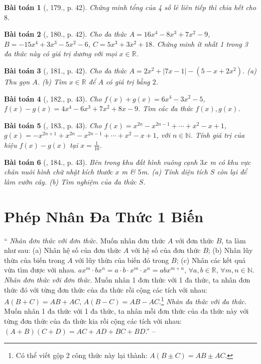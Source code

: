 \documentclass{article}
\newtheorem{baitoan}{Bài toán}
\begin{document}
\begin{baitoan}[\cite{Tuyen_Toan_7}, 179., p. 42]
	Chứng minh tổng của 4 số lẻ liên tiếp thì chia hết cho $8$.
\end{baitoan}

\begin{baitoan}[\cite{Tuyen_Toan_7}, 180., p. 42]
	Cho đa thức $A = 16x^4 - 8x^3 + 7x^2 - 9$, $B = -15x^4 + 3x^3 - 5x^2 - 6$, $C = 5x^3 + 3x^2 + 18$. Chứng minh ít nhất 1 trong 3 đa thức này có giá trị dương với mọi $x\in\mathbb{R}$.
\end{baitoan}

\begin{baitoan}[\cite{Tuyen_Toan_7}, 181., p. 42]
	Cho đa thức $A = 2x^2 + |7x - 1| - (5 - x + 2x^2)$. (a) Thu gọn $A$. (b) Tìm $x\in\mathbb{R}$ để $A$ có giá trị bằng $2$.
\end{baitoan}

\begin{baitoan}[\cite{Tuyen_Toan_7}, 182., p. 43]
	Cho $f(x) + g(x) = 6x^4 - 3x^2 - 5$, $f(x) - g(x) = 4x^4 - 6x^3 + 7x^2 + 8x - 9$. Tìm các đa thức $f(x),g(x)$.
\end{baitoan}

\begin{baitoan}[\cite{Tuyen_Toan_7}, 183., p. 43]
	Cho $f(x) = x^{2n} - x^{2n-1} + \cdots + x^2 - x + 1$, $g(x) = -x^{2n+1} + x^{2n} - x^{2n-1} + \cdots + x^2 - x + 1$, với $n\in\mathbb{N}$. Tính giá trị của hiệu $f(x) - g(x)$ tại $x = \frac{1}{10}$.
\end{baitoan}

\begin{baitoan}[\cite{Tuyen_Toan_7}, 184., p. 43]
	Bên trong khu đất hình vuông cạnh $3x$ \emph{m} có khu vực chăn nuôi hình chữ nhật kích thước $x$ \emph{m} \& $5$\emph{m}. (a) Tính diện tích $S$ còn lại để làm vườn cây. (b) Tìm nghiệm của đa thức $S$.
\end{baitoan}


\section{Phép Nhân Đa Thức 1 Biến}
`` \textit{Nhân đơn thức với đơn thức.} Muốn nhân đơn thức $A$ với đơn thức $B$, ta làm như sau: (a) Nhân hệ số của đơn thức $A$ với hệ số của đơn thức $B$; (b) Nhân lũy thừa của biến trong $A$ với lũy thừa của biến đó trong $B$; (c) Nhân các kết quả vừa tìm được với nhau. $ax^m\cdot bx^n = a\cdot b\cdot x^m\cdot x^n = abx^{m+n}$, $\forall a,b\in\mathbb{R}$, $\forall m,n\in\mathbb{N}$.  \textit{Nhân đơn thức với đơn thức.} Muốn nhân 1 đơn thức với 1 đa thức, ta nhân đơn thức đó với từng đơn thức của đa thức rồi cộng các tích với nhau: $A(B + C) = AB + AC$, $A(B - C) = AB - AC$.\footnote{Có thể viết gộp 2 công thức này lại thành: $A(B\pm C) = AB\pm AC$.}  \textit{Nhân đa thức với đa thức.} Muốn nhân 1 đa thức với 1 đa thức, ta nhân mỗi đơn thức của đa thức này với từng đơn thức của đa thức kia rồi cộng các tích với nhau: $(A + B)(C + D) = AC + AD + BC + BD$.'' -- \cite[Chap. VI, \S4, pp. 47--48]{SBT_Toan_7_Canh_Dieu_tap_2}
\end{document}
